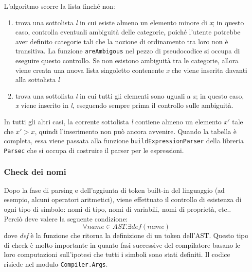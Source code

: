 \documentclass[10pt,a4paper]{article}
\begin{document}
L'algoritmo scorre la lista finché non:
\begin{enumerate}
    \item trova una sottolista \textit{l} in cui esiste almeno un elemento minore di \textit{x}; in questo caso, controlla
    eventuali ambiguità delle categorie, poiché l'utente potrebbe aver definito categorie tali che la nozione di
    ordinamento tra loro non è transitiva. La funzione \texttt{areAmbigous} nel pezzo di pseudocodice si occupa
    di eseguire questo controllo. Se non esistono ambiguità tra le categorie, allora viene creata una nuova lista
    singoletto contenente \textit{x} che viene inserita davanti alla sottolista \textit{l}
    \item trova una sottolista \textit{l} in cui tutti gli elementi sono uguali a \textit{x}; in questo caso, \textit{x}
    viene inserito in \textit{l}, eseguendo sempre prima il controllo sulle ambiguità.
\end{enumerate}
In tutti gli altri casi, la corrente sottolista \textit{l} contiene almeno un elemento $ x' $ tale che
$ x' > x $, quindi l'inserimento non può ancora avvenire. Quando la tabella è completa, essa viene passata alla
funzione \texttt{buildExpressionParser} della libreria \texttt{Parsec} che si occupa di costruire il parser per le
espressioni.

\subsubsection{Check dei nomi}
Dopo la fase di parsing e dell'aggiunta di token built-in del linguaggio (ad esempio, alcuni operatori aritmetici),
viene effettuato il controllo di esistenza di ogni tipo di simbolo: nomi di tipo, nomi di variabili, nomi di proprietà,
etc.. Perciò deve valere la seguente condizione:
    \[ \forall name \in AST. \exists def(name) \]
dove \textit{def} è la funzione che ritorna la definizione di un token dell'AST.
Questo tipo di check è molto importante in quanto fasi successive del compilatore basano le loro computazioni
sull'ipotesi che tutti i simboli sono stati definiti. Il codice risiede nel modulo \texttt{Compiler.Args}.
\end{document}
